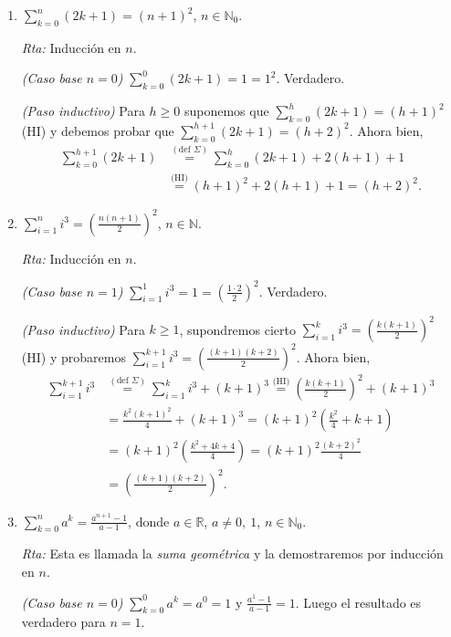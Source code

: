 \documentclass[12pt,spanish,makeidx]{amsbook}
\newcommand{\rta}{\noindent\textit{Rta: }}
\begin{document}
\begin{enumerate}
\begin{enumerate}
			\item  $\displaystyle{ \sum_{k=0}^n (2k+1) = (n+1)^2}$, $n\in \mathbb N_0$.
			
			\rta Inducción en $n$.
			
			\textit{(Caso base $n=0$) } $\sum_{k=0}^0 (2k+1) = 1 = 1^2$. Verdadero.
			
			\textit{(Paso inductivo) } Para $h \ge 0$ suponemos que $\sum_{k=0}^h (2k+1) = (h+1)^2$ (HI) y debemos probar que $\sum_{k=0}^{h+1} (2k+1) = (h+2)^2$. Ahora bien, 
			\begin{align*}
				\sum_{k=0}^{h+1} (2k+1) &\overset{(\text{def } \Sigma)}{=} \sum_{k=0}^h (2k+1) + 2(h+1) +1 \\ &\overset{\text{(HI)}}{=}  (h+1)^2 + 2(h+1) +1 = (h+2)^2.
			\end{align*}
			
			\item  $\displaystyle{ \sum_{i=1}^n i^3 = \left( \frac{n(n+1)}{2 }\right)^2}$, $n\in \mathbb N$.
			
			\rta Inducción en $n$.
			
			\textit{(Caso base $n=1$) } $\sum_{i=1}^1 i^3 = 1 = (\frac{1 \cdot 2}{2})^2$. Verdadero. 
			
			\textit{(Paso inductivo) } Para  $k \ge 1$,  supondremos cierto $\sum_{i=1}^k i^3 = \left( \frac{k(k+1)}{2 }\right)^2$ (HI) y probaremos $\sum_{i=1}^{k+1} i^3 = \left( \frac{(k+1)(k+2)}{2 }\right)^2$. Ahora bien,
			\begin{align*}
				\sum_{i=1}^{k+1} i^3 &\overset{(\text{def } \Sigma)}{=} \sum_{i=1}^k i^3 + (k+1)^3 \overset{\text{(HI)}}{=}  \left( \frac{k(k+1)}{2 }\right)^2 + (k+1)^3 \\
				&= \frac{k^2(k+1)^2}{4 } + (k+1)^3 = (k+1)^2 \left(\frac{k^2}{4 } + k+1 \right)\\
				&= (k+1)^2 \left(\frac{k^2+4k +4}{4 } \right) = (k+1)^2\frac{(k+2)^2}{4 } \\
				&= \left( \frac{(k+1)(k+2)}{2 }\right)^2.
			\end{align*}
			
			\item  $\displaystyle{ \sum_{k=0}^n a^k = \frac{a^{n+1}-1}{a-1}}$, donde $a\in {\mathbb R}$, $a \neq 0,\ 1$, $n\in \mathbb N_0$.
			
			\rta Esta es llamada la \textit{suma geométrica} y la demostraremos por inducción en $n$.
			
			\textit{(Caso base $n=0$) } $\sum_{k=0}^0 a^k = a^0 = 1$ y $\frac{a^{1}-1}{a-1}=1$. Luego el resultado es verdadero para  $n=1$. 
			

\end{enumerate}
\end{enumerate}
\end{document}
